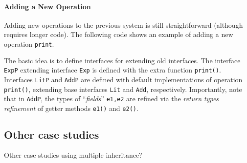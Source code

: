 

\paragraph{\textbf{Adding a New Operation}}
Adding new operations to the previous system is still straightforward (although
requires longer code). The following code shows an example of adding a new
operation \texttt{print}. 


The basic idea is to define interfaces for extending old interfaces.  The
interface \texttt{ExpP} extending interface \texttt{Exp} is defined with the
extra function \texttt{print()}. Interfaces \texttt{LitP} and \texttt{AddP} are
defined with default implementations of operation \texttt{print()}, extending
base interfaces \texttt{Lit} and \texttt{Add}, respectively. Importantly, note
that in \texttt{AddP}, the types of ``\emph{fields}'' \texttt{e1,e2} are refined via
the \emph{return types refinement} of getter methods \texttt{e1()} and
\texttt{e2()}. 

\subsection{Other case studies}

Other case studies using multiple inheritance?

